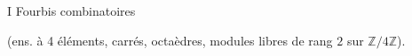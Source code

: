 I \hfill Fourbis combinatoires

(ens. à 4 éléments, carrés, octaèdres, modules libres de rang $2$ sur $\mathbb{Z}/4\mathbb{Z}$).
